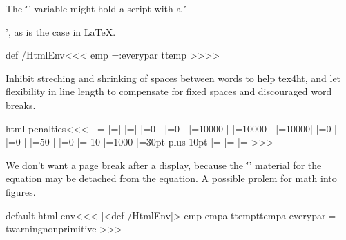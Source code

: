 The \''\output' variable might hold a script
with
a \''\par', as is the case in LaTeX.

\<def /HtmlEnv\><<<
\edef\:temp{%
   \output={\noexpand\SaveEverypar \noexpand\ht:everypar{}\the\output
         \noexpand\RecallEverypar}}
\:temp
>>>>





Inhibit streching and shrinking of spaces between words to help tex4ht,
and let flexibility in line length to compensate for fixed spaces and
discouraged word breaks.

\<html penalties\><<<
\frenchspacing        |%
\let\nonfrenchspacing|=\relax
\spaceskip|=\z@        |%
\xspaceskip|=\z@       |%
\linepenalty|=0        |%
\adjdemerits|=0        |%
\pretolerance|=10000   |%
\hyphenpenalty|=10000  |%
\exhyphenpenalty|=10000|%
\clubpenalty|=0        |%
\widowpenalty|=0       |%
\interlinepenalty|=50  |%
\displaywidowpenalty|=0
\predisplaypenalty|=-10
\postdisplaypenalty|=1000
\abovedisplayskip|=30pt plus 10pt
\belowdisplayskip|=\abovedisplayskip
\abovedisplayshortskip|=\abovedisplayskip
\belowdisplayshortskip|=\abovedisplayskip
>>>

We don't want a page break after a display, because the
\''\aftergroup' material for the equation may be detached from the
equation. A possible prolem for math into figures.


\<default html env\><<<
|<def /HtmlEnv|>
\edef\:temp{\meaning\everypar}
\edef\:tempa{\string\everypar}
\ifx \:temp\:tempa   
   \let\ht:everypar|=\everypar
\else
   \:warning{nonprimitive \string\everypar}
\fi
\edef\NoHtmlEnv{%
   \sfcode `\noexpand\noexpand\noexpand\.3000  |%
   \sfcode `\noexpand\noexpand\noexpand\?3000
   \sfcode `\noexpand\noexpand\noexpand\!3000
   \sfcode `\noexpand\noexpand\noexpand\:2000
   \sfcode `\noexpand\noexpand\noexpand\;1500
   \sfcode `\noexpand\noexpand\noexpand\,1250 
   \rightskip|=\the\rightskip  
   \spaceskip|=\the\spaceskip
   \xspaceskip|=\the\xspaceskip
   \linepenalty|=\the\linepenalty
   \adjdemerits|=\the\adjdemerits
   \pretolerance|=\the\pretolerance
   \hyphenpenalty|=\the\hyphenpenalty
   \exhyphenpenalty|=\the\exhyphenpenalty
   \clubpenalty|=\the\clubpenalty
   \widowpenalty|=\the\widowpenalty
   \interlinepenalty|=\the\interlinepenalty
   \displaywidowpenalty|=\the\displaywidowpenalty
   \predisplaypenalty|=\the\predisplaypenalty
   \postdisplaypenalty|=\the\postdisplaypenalty
   \abovedisplayskip|=\the\abovedisplayskip
   \belowdisplayskip|=\the\belowdisplayskip
   \abovedisplayshortskip|=\the\abovedisplayshortskip
   \belowdisplayshortskip|=\the\belowdisplayshortskip
   \noexpand\ht:everypar{\noexpand\the\noexpand\ht:everypar}}
>>>


